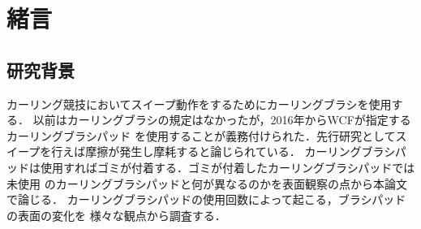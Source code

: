 \documentclass[main]{subfiles}
\begin{document}
\chapter{緒言}
\section{研究背景}
カーリング競技においてスイープ動作をするためにカーリングブラシを使用する．
以前はカーリングブラシの規定はなかったが，2016年からWCFが指定するカーリングブラシパッド
を使用することが義務付けられた．先行研究としてスイープを行えば摩擦が発生し摩耗すると論じられている\cite{ref:maeno2016}．
カーリングブラシパッドは使用すればゴミが付着する．ゴミが付着したカーリングブラシパッドでは未使用
のカーリングブラシパッドと何が異なるのかを表面観察の点から本論文で論じる． 
カーリングブラシパッドの使用回数によって起こる，ブラシパッドの表面の変化を
様々な観点から調査する．
\end{document}
